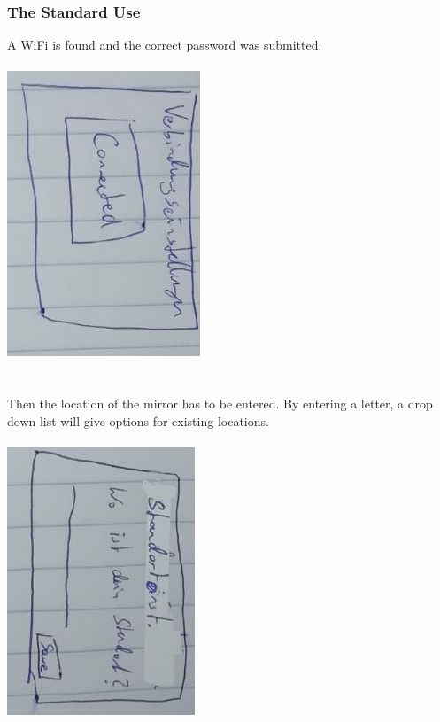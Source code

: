 \documentclass[12pt]{article}
\theoremstyle{definition}
\begin{document}
\subsubsection{The Standard Use}
A WiFi is found and the correct password was submitted.\\\\
\includegraphics[angle=90, scale=.8]{UseCase/VerbindungHergestelltMitInternet.jpeg}\\\\
\\
Then the location of the mirror has to be entered. By entering a letter, a drop down list will give options for existing locations.\\\\
\includegraphics[angle=90, scale=.8]{UseCase/Standorteingabe.jpeg}\\\\
\end{document}
